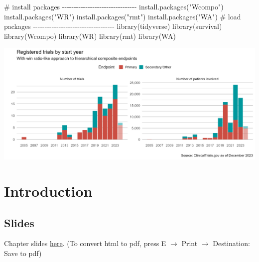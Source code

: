 \documentclass[
  letterpaper,
  DIV=11,
  numbers=noendperiod]{scrreprt}
\newenvironment{Shaded}{\begin{snugshade}}{\end{snugshade}}
\newcommand{\CommentTok}[1]{\textcolor[rgb]{0.37,0.37,0.37}{#1}}
\newcommand{\FunctionTok}[1]{\textcolor[rgb]{0.28,0.35,0.67}{#1}}
\newcommand{\NormalTok}[1]{\textcolor[rgb]{0.00,0.23,0.31}{#1}}
\newcommand{\StringTok}[1]{\textcolor[rgb]{0.13,0.47,0.30}{#1}}
\begin{document}
\begin{Shaded}
\begin{Highlighting}[]
\CommentTok{\# install packages {-}{-}{-}{-}{-}{-}{-}{-}{-}{-}{-}{-}{-}{-}{-}{-}{-}{-}{-}{-}{-}{-}{-}{-}{-}{-}{-}{-}{-}{-}{-}{-}}
\FunctionTok{install.packages}\NormalTok{(}\StringTok{"Wcompo"}\NormalTok{)}
\FunctionTok{install.packages}\NormalTok{(}\StringTok{"WR"}\NormalTok{)}
\FunctionTok{install.packages}\NormalTok{(}\StringTok{"rmt"}\NormalTok{)}
\FunctionTok{install.packages}\NormalTok{(}\StringTok{"WA"}\NormalTok{)}
\CommentTok{\# load packages {-}{-}{-}{-}{-}{-}{-}{-}{-}{-}{-}{-}{-}{-}{-}{-}{-}{-}{-}{-}{-}{-}{-}{-}{-}{-}{-}{-}{-}{-}{-}{-}{-}{-}{-}}
\FunctionTok{library}\NormalTok{(tidyverse)}
\FunctionTok{library}\NormalTok{(survival)}
\FunctionTok{library}\NormalTok{(Wcompo)}
\FunctionTok{library}\NormalTok{(WR)}
\FunctionTok{library}\NormalTok{(rmt)}
\FunctionTok{library}\NormalTok{(WA)}
\end{Highlighting}
\end{Shaded}

\includegraphics{docs/images/intro_Ntrial_title.png}


\hypertarget{introduction}{%
\chapter{Introduction}\label{introduction}}

\hypertarget{slides}{%
\section*{Slides}\label{slides}}


Chapter slides \href{chap1.html}{here}. (To convert html to pdf, press E
\(\to\) Print \(\to\) Destination: Save to pdf)
\end{document}

